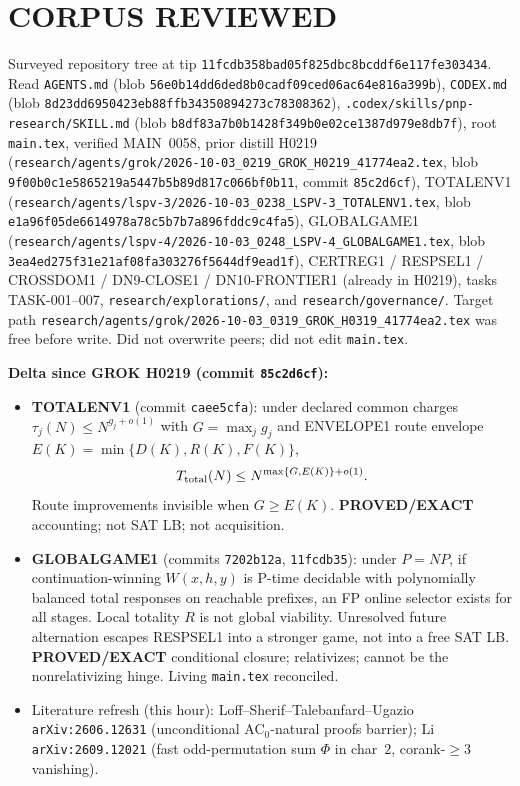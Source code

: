 \documentclass[11pt]{article}
\begin{document}
\section*{CORPUS REVIEWED}
Surveyed repository tree at tip \texttt{11fcdb358bad05f825dbc8bcddf6e117fe303434}.
Read \texttt{AGENTS.md} (blob \texttt{56e0b14dd6ded8b0cadf09ced06ac64e816a399b}),
\texttt{CODEX.md} (blob \texttt{8d23dd6950423eb88ffb34350894273c78308362}),
\texttt{.codex/skills/pnp-research/SKILL.md} (blob
\texttt{b8df83a7b0b1428f349b0e02ce1387d979e8db7f}), root \texttt{main.tex},
verified MAIN~0058, prior distill H0219
(\texttt{research/agents/grok/2026-10-03\_0219\_GROK\_H0219\_41774ea2.tex}, blob
\texttt{9f00b0c1e5865219a5447b5b89d817c066bf0b11}, commit \texttt{85c2d6cf}),
TOTALENV1
(\texttt{research/agents/lspv-3/2026-10-03\_0238\_LSPV-3\_TOTALENV1.tex}, blob
\texttt{e1a96f05de6614978a78c5b7b7a896fddc9c4fa5}),
GLOBALGAME1
(\texttt{research/agents/lspv-4/2026-10-03\_0248\_LSPV-4\_GLOBALGAME1.tex}, blob
\texttt{3ea4ed275f31e21af08fa303276f5644df9ead1f}),
CERTREG1 / RESPSEL1 / CROSSDOM1 / DN9-CLOSE1 / DN10-FRONTIER1 (already in
H0219), tasks TASK-001--007, \texttt{research/explorations/}, and
\texttt{research/governance/}. Target path
\texttt{research/agents/grok/2026-10-03\_0319\_GROK\_H0319\_41774ea2.tex}
was free before write. Did not overwrite peers; did not edit \texttt{main.tex}.

\textbf{Delta since GROK H0219 (commit \texttt{85c2d6cf}):}
\begin{itemize}
\item \textbf{TOTALENV1} (commit \texttt{caee5cfa}): under declared common
charges $\tau_j(N)\le N^{g_j+o(1)}$ with $G=\max_j g_j$ and ENVELOPE1 route
envelope $E(K)=\min\{D(K),R(K),F(K)\}$,
\[
T_{\rm total}(N)\le N^{\max\{G,E(K)\}+o(1)}.
\]
Route improvements invisible when $G\ge E(K)$. \textbf{PROVED/EXACT}
accounting; not SAT LB; not acquisition.
\item \textbf{GLOBALGAME1} (commits \texttt{7202b12a}, \texttt{11fcdb35}):
under $P=NP$, if continuation-winning $W(x,h,y)$ is P-time decidable with
polynomially balanced total responses on reachable prefixes, an FP online
selector exists for all stages. Local totality $R$ is not global viability.
Unresolved future alternation escapes RESPSEL1 into a stronger game, not into
a free SAT LB. \textbf{PROVED/EXACT} conditional closure; relativizes;
cannot be the nonrelativizing hinge. Living \texttt{main.tex} reconciled.
\item Literature refresh (this hour): Loff--Sherif--Talebanfard--Ugazio
\texttt{arXiv:2606.12631} (unconditional AC$_0$-natural proofs barrier);
Li \texttt{arXiv:2609.12021} (fast odd-permutation sum $\Phi$ in char~$2$,
corank-$\ge 3$ vanishing).
\end{itemize}
\end{document}

